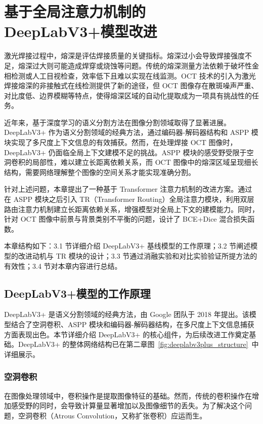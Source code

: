 \clearpage

\section{基于全局注意力机制的 DeepLabV3+模型改进}

激光焊接过程中，熔深是评估焊接质量的关键指标。熔深过小会导致焊接强度不足，熔深过大则可能造成焊穿或烧蚀等问题。传统的熔深测量方法依赖于破坏性金相检测或人工目视检查，效率低下且难以实现在线监测。OCT 技术的引入为激光焊接熔深的非接触式在线检测提供了新的途径，但 OCT 图像存在散斑噪声严重、对比度低、边界模糊等特点，使得熔深区域的自动化提取成为一项具有挑战性的任务。

近年来，基于深度学习的语义分割方法在图像分割领域取得了显著进展。DeepLabV3+ 作为语义分割领域的经典方法，通过编码器-解码器结构和 ASPP 模块实现了多尺度上下文信息的有效捕获。然而，在处理焊接 OCT 图像时，DeepLabV3+ 仍面临全局上下文建模不足的挑战。ASPP 模块的感受野受限于空洞卷积的局部性，难以建立长距离依赖关系，而 OCT 图像中的熔深区域呈现细长结构，需要网络理解整个图像的空间关系才能实现准确分割。

针对上述问题，本章提出了一种基于 Transformer 注意力机制的改进方案。通过在 ASPP 模块之后引入 TR（Transformer Routing）全局注意力模块，利用双层路由注意力机制建立长距离依赖关系，增强模型对全局上下文的建模能力。同时，针对 OCT 图像中前景与背景类别不平衡的问题，设计了 BCE+Dice 混合损失函数。

本章结构如下：3.1 节详细介绍 DeepLabV3+ 基线模型的工作原理；3.2 节阐述模型的改进动机与 TR 模块的设计；3.3 节通过消融实验和对比实验验证所提方法的有效性；3.4 节对本章内容进行总结。

\subsection{DeepLabV3+模型的工作原理}

DeepLabV3+ 是语义分割领域的经典方法，由 Google 团队于 2018 年提出。该模型结合了空洞卷积、ASPP 模块和编码器-解码器结构，在多尺度上下文信息捕获方面表现出色。本节详细介绍 DeepLabV3+ 的核心组件，为后续改进工作奠定基础。DeepLabV3+ 的整体网络结构已在第二章图~\ref{fig:deeplabv3plus_structure}~中详细展示。

\subsubsection{空洞卷积}

在图像处理领域中，卷积操作是提取图像特征的基础。然而，传统的卷积操作在增加感受野的同时，会导致计算量显著增加以及图像细节的丢失。为了解决这个问题，空洞卷积（Atrous Convolution，又称扩张卷积）应运而生。


